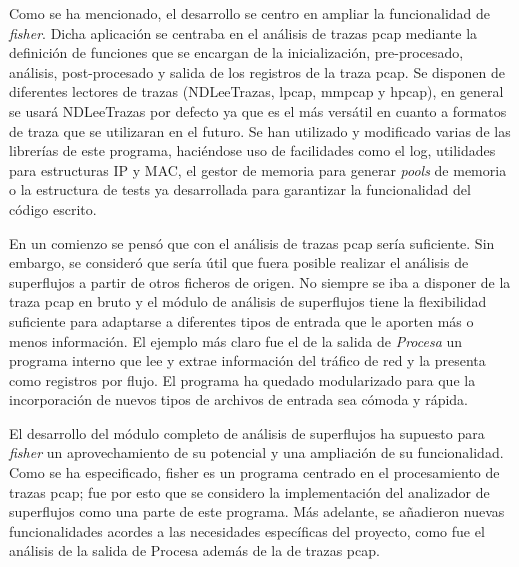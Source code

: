 \documentclass[tfg,epsbased,lof,lot,loa,final,nocopyright,overleaf]{tfgtfmthesisuam}
\begin{document}
Como se ha mencionado, el desarrollo se centro en ampliar la funcionalidad de \textit{fisher}. Dicha aplicación se centraba en el análisis de trazas pcap mediante la definición de funciones que se encargan de la inicialización, pre-procesado, análisis, post-procesado y salida de los registros de la traza pcap. Se disponen de diferentes lectores de trazas (NDLeeTrazas, lpcap, mmpcap y hpcap), en general se usará NDLeeTrazas por defecto ya que es el más versátil en cuanto a formatos de traza que se utilizaran en el futuro. 
Se han utilizado y modificado varias de las librerías de este programa, haciéndose uso de facilidades como el log, utilidades para estructuras IP y MAC, el gestor de memoria para generar \textit{pools} de memoria o la estructura de tests ya desarrollada para garantizar la funcionalidad del código escrito.

En un comienzo se pensó que con el análisis de trazas pcap sería suficiente. Sin embargo, se consideró que sería útil que fuera posible realizar el análisis de superflujos a partir de otros ficheros de origen. No siempre se iba a disponer de la traza pcap en bruto y el módulo de análisis de superflujos tiene la flexibilidad suficiente para adaptarse a diferentes tipos de entrada que le aporten más o menos información. El ejemplo más claro fue el de la salida de \textit{Procesa} un programa interno que lee y extrae información del tráfico de red y la presenta como registros por flujo. El programa ha quedado modularizado para que la incorporación de nuevos tipos de archivos de entrada sea cómoda y rápida.

El desarrollo del módulo completo de análisis de superflujos ha supuesto para \textit{fisher} un aprovechamiento de su potencial y una ampliación de su funcionalidad. Como se ha especificado, fisher es un programa centrado en el procesamiento de trazas pcap; fue por esto que se considero la implementación del analizador de superflujos como una parte de este programa. Más adelante, se añadieron nuevas funcionalidades acordes a las necesidades específicas del proyecto, como fue el análisis de la salida de Procesa además de la de trazas pcap.
\end{document}
